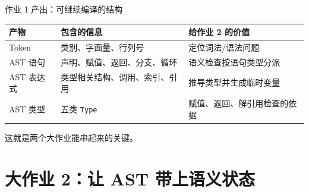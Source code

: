 \documentclass[aspectratio=169]{ctexbeamer}
\begin{document}
\begin{frame}{作业 1 产出：可继续编译的结构}
    \begin{table}
    \centering
    \small
    \begin{tabular}{p{2.5cm}p{5.1cm}p{4.9cm}}
        \toprule
        \textbf{产物} & \textbf{包含的信息} & \textbf{给作业 2 的价值} \\
        \midrule
        Token & 类别、字面量、行列号 & 定位词法/语法问题 \\
        AST 语句 & 声明、赋值、返回、分支、循环 & 语义检查按语句类型分派 \\
        AST 表达式 & 类型相关结构、调用、索引、引用 & 推导类型并生成临时变量 \\
        AST 类型 & 五类 \texttt{Type} & 赋值、返回、解引用检查的依据 \\
        \bottomrule
    \end{tabular}
    \end{table}
    \vspace{0.2em}
    \centering
    这就是两个大作业能串起来的关键。
\end{frame}

\section{大作业 2：让 AST 带上语义状态}
\end{document}
